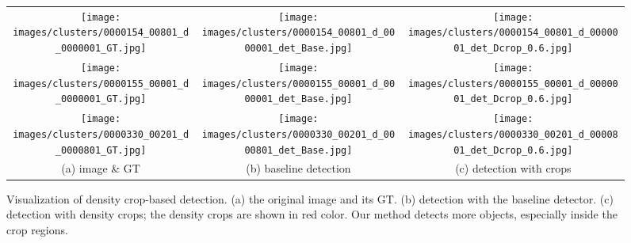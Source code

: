 \begin{figure*}
\centering
\begin{tabular}{c @{\hspace{-0.3cm}} c  @{\hspace{-0.3cm}} c}
\texttt{[image: images/clusters/0000154\_00801\_d\_0000001\_GT.jpg]} &
\texttt{[image: images/clusters/0000154\_00801\_d\_0000001\_det\_Base.jpg]} &
\texttt{[image: images/clusters/0000154\_00801\_d\_0000001\_det\_Dcrop\_0.6.jpg]} \\
\texttt{[image: images/clusters/0000155\_00001\_d\_0000001\_GT.jpg]} &
\texttt{[image: images/clusters/0000155\_00001\_d\_0000001\_det\_Base.jpg]} &
\texttt{[image: images/clusters/0000155\_00001\_d\_0000001\_det\_Dcrop\_0.6.jpg]} \\
\texttt{[image: images/clusters/0000330\_00201\_d\_0000801\_GT.jpg]} &
\texttt{[image: images/clusters/0000330\_00201\_d\_0000801\_det\_Base.jpg]} &
\texttt{[image: images/clusters/0000330\_00201\_d\_0000801\_det\_Dcrop\_0.6.jpg]} \\
 (a) image \& GT & (b) baseline detection & (c) detection with crops \\
 \end{tabular}
 \caption{Visualization of density crop-based detection. (a) the original image and its GT. (b) detection with the baseline detector. (c) detection with density crops; the density crops are shown in red color. Our method detects more objects, especially inside the crop regions.}
 \label{fig:clusters}
\end{figure*}

